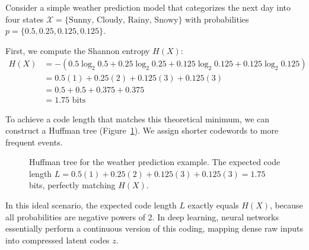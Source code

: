 Consider a simple weather prediction model that categorizes the next day into four states $\mathcal{X} = \{\text{Sunny, Cloudy, Rainy, Snowy}\}$ with probabilities $p = \{0.5, 0.25, 0.125, 0.125\}$.

First, we compute the Shannon entropy $H(X)$:
\begin{align*}
    H(X) &= - \left( 0.5 \log_2 0.5 + 0.25 \log_2 0.25 + 0.125 \log_2 0.125 + 0.125 \log_2 0.125 \right) \\
    &= 0.5(1) + 0.25(2) + 0.125(3) + 0.125(3) \\
    &= 0.5 + 0.5 + 0.375 + 0.375 \\
    &= 1.75 \text{ bits}
\end{align*}

To achieve a code length that matches this theoretical minimum, we can construct a Huffman tree (Figure~\ref{fig:huffman}). We assign shorter codewords to more frequent events.

\begin{figure}[ht]
    \centering
    \caption{Huffman tree for the weather prediction example. The expected code length $L = 0.5(1) + 0.25(2) + 0.125(3) + 0.125(3) = 1.75$ bits, perfectly matching $H(X)$.}
    \label{fig:huffman}
\end{figure}

In this ideal scenario, the expected code length $L$ exactly equals $H(X)$, because all probabilities are negative powers of 2. In deep learning, neural networks essentially perform a continuous version of this coding, mapping dense raw inputs into compressed latent codes $z$. 

